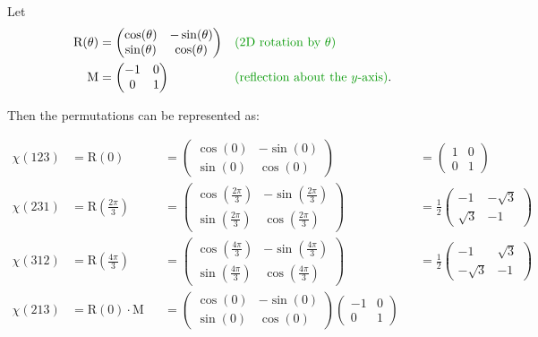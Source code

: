 \documentclass[12pt]{extarticle}
\begin{document}
\newpage

Let
\begin{align*}
\text{R}(\theta) & = \begin{pmatrix} \cos(\theta) & -\sin(\theta) \\ \sin(\theta) & \cos(\theta) \end{pmatrix} && \expl{2D rotation by $\theta$} \\
\text{M} & = \begin{pmatrix} -1 & 0 \\ 0 & 1 \end{pmatrix} && \expl{reflection about the $y$-axis}.
\end{align*}

Then the permutations can be represented as:

\begin{align*}
\chi(123) & = \text{R}(0)
&& = \begin{pmatrix} \cos(0) & -\sin(0) \\ \sin(0) & \cos(0) \end{pmatrix}
&& = \begin{pmatrix} 1 & 0 \\  0 & 1 \end{pmatrix} \\
\chi(231) & = \text{R}\left(\frac{2\pi}{3}\right)
&& = \begin{pmatrix} \cos(\frac{2\pi}{3}) & -\sin(\frac{2\pi}{3}) \\ \sin(\frac{2\pi}{3}) & \cos(\frac{2\pi}{3}) \end{pmatrix}
&& = \frac{1}{2} \begin{pmatrix} -1 & -\sqrt{3} \\ \sqrt{3} & -1 \end{pmatrix} \\
\chi(312) & = \text{R}\left(\frac{4\pi}{3}\right)
&& = \begin{pmatrix} \cos(\frac{4\pi}{3}) & -\sin(\frac{4\pi}{3}) \\ \sin(\frac{4\pi}{3}) & \cos(\frac{4\pi}{3}) \end{pmatrix}
&& = \frac{1}{2} \begin{pmatrix} -1 & \sqrt{3} \\ -\sqrt{3} & -1 \end{pmatrix} \\
\chi(213) & = \text{R}(0) \cdot \text{M}
&& = \begin{pmatrix} \cos(0) & -\sin(0) \\ \sin(0) & \cos(0) \end{pmatrix} \begin{pmatrix}-1 & 0 \\ 0 & 1\end{pmatrix}

\end{align*}
\end{document}
